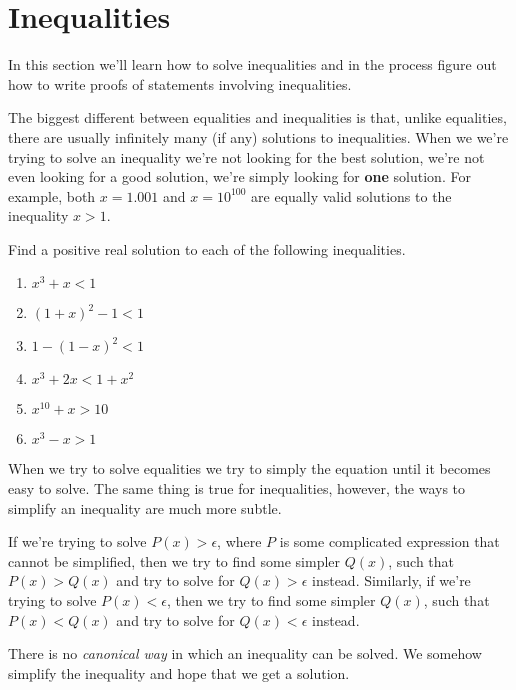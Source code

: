 
\section{Inequalities}
In this section we'll learn how to solve inequalities and in the process figure out how to write proofs of statements involving inequalities.


The biggest different between equalities and inequalities is that, unlike equalities, there are usually infinitely many (if any) solutions to inequalities. When we we're trying to solve an inequality we're not looking for the best solution, we're not even looking for a good solution, we're simply looking for {\bf one} solution. For example, both $x = 1.001$ and $x = 10^{100}$ are equally valid solutions to the inequality $x > 1$.

\begin{exercise}
	Find a positive real solution to each of the following inequalities.
	\begin{enumerate}
		\item $x ^ 3 + x < 1$
		\item $(1 + x)^2 - 1 < 1$
		\item $1 - (1 - x)^2 < 1$
		\item $x ^ 3 + 2x < 1 + x^2$
		\item $x^{10} + x > 10 $
		\item $x^3 - x > 1$
	\end{enumerate}
\end{exercise}

When we try to solve equalities we try to simply the equation until it becomes easy to solve. The same thing is true for inequalities, however, the ways to simplify an inequality are much more subtle.

\begin{example}
	If we're trying to solve $P(x) > \epsilon$, where $P$ is some complicated expression that cannot be simplified, then we try to find some simpler $Q(x)$, such that $P(x) > Q(x)$ and try to solve for $Q(x) > \epsilon$ instead. Similarly, if we're trying to solve $P(x) < \epsilon$, then we try to find some simpler $Q(x)$, such that $P(x) < Q(x)$ and try to solve for $Q(x) < \epsilon$ instead.

	 There is no {\it canonical way} in which an inequality can be solved. We somehow simplify the inequality and hope that we get a solution.
\end{example}


